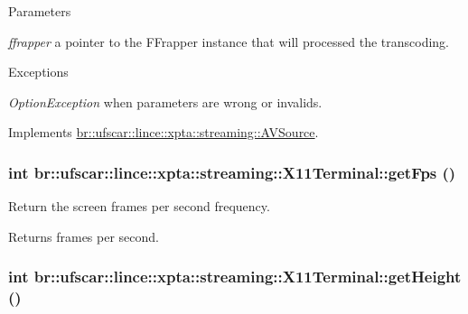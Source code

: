 \begin{DoxyParams}{Parameters}
\item[{\em ffrapper}]a pointer to the FFrapper instance that will processed the transcoding. \end{DoxyParams}

\begin{DoxyExceptions}{Exceptions}
\item[{\em OptionException}]when parameters are wrong or invalids. \end{DoxyExceptions}


Implements \hyperlink{classbr_1_1ufscar_1_1lince_1_1xpta_1_1streaming_1_1AVSource_a35f8e70290dafd5ad952f54c3bc44ce3}{br::ufscar::lince::xpta::streaming::AVSource}.

\hypertarget{classbr_1_1ufscar_1_1lince_1_1xpta_1_1streaming_1_1X11Terminal_afe951939b484e65bad24b52e4c9bbb52}{
\subsubsection[{getFps}]{\setlength{\rightskip}{0pt plus 5cm}int br::ufscar::lince::xpta::streaming::X11Terminal::getFps ()}}
\label{classbr_1_1ufscar_1_1lince_1_1xpta_1_1streaming_1_1X11Terminal_afe951939b484e65bad24b52e4c9bbb52}


Return the screen frames per second frequency. 

\begin{DoxyReturn}{Returns}
frames per second. 
\end{DoxyReturn}
\hypertarget{classbr_1_1ufscar_1_1lince_1_1xpta_1_1streaming_1_1X11Terminal_a343d98ed7a5ce3da708e7ae027197abe}{
\subsubsection[{getHeight}]{\setlength{\rightskip}{0pt plus 5cm}int br::ufscar::lince::xpta::streaming::X11Terminal::getHeight ()}}
\label{classbr_1_1ufscar_1_1lince_1_1xpta_1_1streaming_1_1X11Terminal_a343d98ed7a5ce3da708e7ae027197abe}


